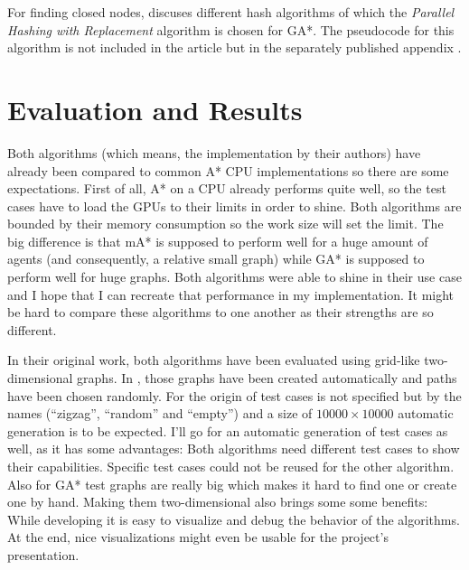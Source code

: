 \documentclass[
    paper = a4,
    twocolumn = true,
    DIV = calc
]{scrartcl}
\newcommand{\mA}{mA*}
\newcommand{\GA}{GA*}
\begin{document}
For finding closed nodes, \cite{zhou2015massively} discuses different hash algorithms of which the \emph{Parallel Hashing with Replacement} algorithm is chosen for \GA{}. The pseudocode for this algorithm is not included in the article but in the separately published appendix \cite{zhou2015appendix}.


\section{Evaluation and Results}


Both algorithms (which means, the implementation by their authors) have already been compared to common A* CPU implementations so there are some expectations. First of all, A* on a CPU already performs quite well, so the test cases have to load the GPUs to their limits in order to shine. Both algorithms are bounded by their memory consumption so the work size will set the limit. The big difference is that \mA{} is supposed to perform well for a huge amount of agents (and consequently, a relative small graph) while \GA{} is supposed to perform well for huge graphs. Both algorithms were able to shine in their use case and I hope that I can recreate that performance in my implementation. It might be hard to compare these algorithms to one another as their strengths are so different.

In their original work, both algorithms have been evaluated using grid-like two-dimensional graphs. In \cite{silva2011gpu}, those graphs have been created automatically and paths have been chosen randomly. For \cite{zhou2015massively} the origin of test cases is not specified but by the names (``zigzag'', ``random'' and ``empty'') and a size of \(10000 \times 10000\) automatic generation is to be expected. I'll go for an automatic generation of test cases as well, as it has some advantages: Both algorithms need different test cases to show their capabilities. Specific test cases could not be reused for the other algorithm. Also for \GA{} test graphs are really big which makes it hard to find one or create one by hand. Making them two-dimensional also brings some some benefits: While developing it is easy to visualize and debug the behavior of the algorithms. At the end, nice visualizations might even be usable for the project's presentation.
\end{document}
